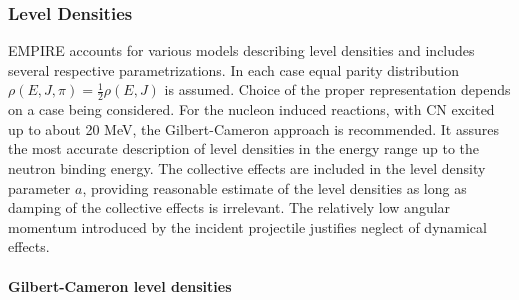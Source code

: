 %
%
%

\subsubsection{Level Densities}

EMPIRE accounts for various models describing level densities%
 and includes several respective parametrizations. In
each case equal parity distribution $\rho(E,J,\pi)=%
\frac{1}{2}\rho(E,J)$ is assumed. Choice of the proper representation
depends on a case being considered. For the nucleon induced reactions, with
CN excited up to about 20 MeV, the Gilbert-Cameron approach is recommended.
It assures the most accurate description of level densities in the energy
range up to the neutron binding energy. The collective effects are included
in the level density parameter $a$, providing reasonable estimate of the
level densities as long as damping of the collective effects is irrelevant.
The relatively low angular momentum introduced by the incident projectile
justifies neglect of dynamical effects.

\medskip

\paragraph{Gilbert-Cameron level densities}

